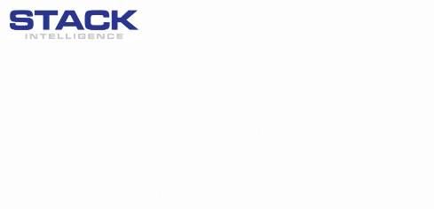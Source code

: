 \clearpage
\thispagestyle{empty}
\pagecolor[HTML]{2a368e}
\begin{center}
\vspace*{3cm}

\includegraphics[width=0.3\textwidth]{../brand-assets/images/Stack Intelligence Words Only.png}

\vspace{3cm}

{\Large\textcolor{white}{Transform your customer relationships from one-time transactions to lifetime value}}

\vspace{3cm}

{\normalsize\textcolor{white}{
Website: www.stackintelligence.com\\
Executive Contact: Justin Leader, Managing Director\\
Email: justin@stackintelligence.com\\
Phone: (555) 123-4567
}}

\vspace{2cm}

{\small\textcolor{white}{© 2025 Stack Intelligence. All rights reserved.}}
\end{center}
\pagecolor{white}